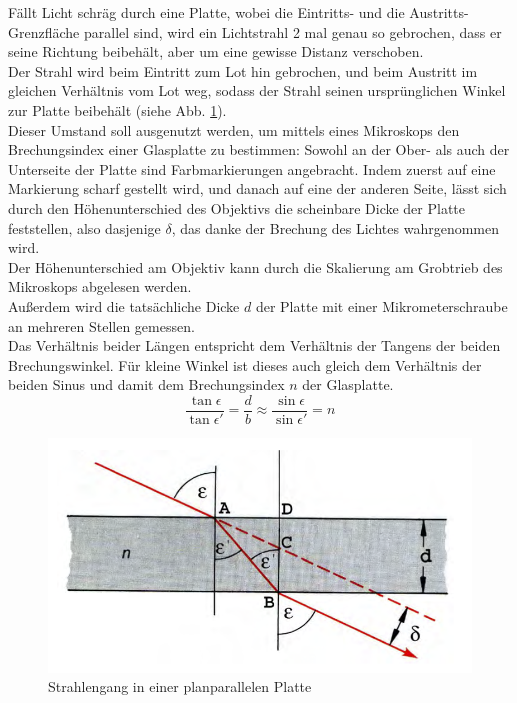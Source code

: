 \documentclass[12pt,a4paper]{article}
\begin{document}
\begin{multicols}{2}
Fällt Licht schräg durch eine Platte, wobei die Eintritts- und die Austritts-Grenzfläche parallel sind, wird ein Lichtstrahl 2 mal genau so gebrochen, dass er seine Richtung beibehält, aber um eine gewisse Distanz verschoben.\\
Der Strahl wird beim Eintritt zum Lot hin gebrochen, und beim Austritt im gleichen Verhältnis vom Lot weg, sodass der Strahl seinen ursprünglichen Winkel zur Platte beibehält (siehe Abb. \ref{fig:planparallele_Skizze}).\\
Dieser Umstand soll ausgenutzt werden, um mittels eines Mikroskops den Brechungsindex einer Glasplatte zu bestimmen: Sowohl an der Ober- als auch der Unterseite  der Platte sind Farbmarkierungen angebracht. Indem zuerst auf eine Markierung scharf gestellt wird, und danach auf eine der anderen Seite, lässt sich durch den Höhenunterschied des Objektivs die scheinbare Dicke der Platte feststellen, also dasjenige $\delta$, das danke der Brechung des Lichtes wahrgenommen wird.\\
Der Höhenunterschied am Objektiv kann durch die Skalierung am Grobtrieb des Mikroskops abgelesen werden.\\
Außerdem wird die tatsächliche Dicke $d$ der Platte mit einer Mikrometerschraube an mehreren Stellen gemessen.\\
Das Verhältnis beider Längen entspricht dem Verhältnis der Tangens der beiden Brechungswinkel. Für kleine Winkel ist dieses auch gleich dem Verhältnis der beiden Sinus und damit dem Brechungsindex $n$ der Glasplatte.
$$\frac{\tan{\epsilon}}{\tan{\epsilon '}}=\frac{d}{b}\approx \frac{\sin{\epsilon}}{\sin{\epsilon '}}=n$$


\begin{figure}[H]
	\centering
	\includegraphics[scale=0.65]{./figure/planparallele_Skizze.png}
	\caption{Strahlengang in einer planparallelen Platte}
	\label{fig:planparallele_Skizze}
\end{figure}



\end{multicols}
\end{document}
